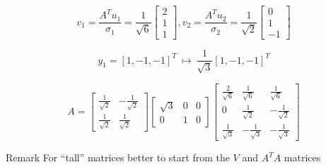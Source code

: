 \documentclass[fullscreen=true, bookmarks=true, hyperref={pdfencoding=unicode}]{beamer}
\begin{document}
\begin{frame}
  $$v_1 = \frac{A^Tu_1}{\sigma_1} = \frac{1}{\sqrt{6}} \begin{bmatrix}
    2 \\ 1  \\ 1
  \end{bmatrix}, 
  v_2 = \frac{A^Tu_2}{\sigma_2} = \frac{1}{\sqrt{2}} \begin{bmatrix}
    0 \\ 1  \\ -1
  \end{bmatrix}$$

  \pause $$y_1 = [1, -1, -1]^T\ \mapsto\ \frac{1}{\sqrt{3}}[1, -1, -1]^T$$

  \pause $$ A = \begin{bmatrix}
    \frac{1}{\sqrt{2}} & -\frac{1}{\sqrt{2}} \\ 
    \frac{1}{\sqrt{2}} & \frac{1}{\sqrt{2}}
  \end{bmatrix} 
  \begin{bmatrix}
    \sqrt{3} & 0 & 0 \\
      0 & 1 & 0
  \end{bmatrix} 
  \begin{bmatrix}
    \frac{2}{\sqrt{6}} & \frac{1}{\sqrt{6}} & \frac{1}{\sqrt{6}} \\ 
     0 & \frac{1}{\sqrt{2}} & -\frac{1}{\sqrt{2}} \\
     \frac{1}{\sqrt{3}} & -\frac{1}{\sqrt{3}} & -\frac{1}{\sqrt{3}}
  \end{bmatrix}$$

  \begin{block}{Remark}
    For ``tall'' matrices better to start from the $V$ and $A^TA$ matrices
  \end{block}
\end{frame}
\end{document}
